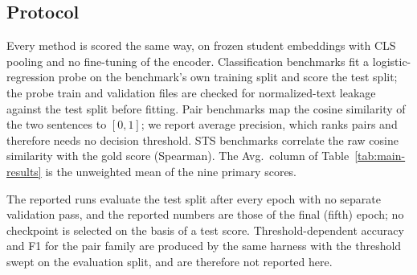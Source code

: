 \subsection{Protocol}
\label{app:protocol}

Every method is scored the same way, on frozen student embeddings with CLS
pooling and no fine-tuning of the encoder. Classification benchmarks fit a
logistic-regression probe on the benchmark's own training split and score the
test split; the probe train and validation files are checked for
normalized-text leakage against the test split before fitting. Pair benchmarks
map the cosine similarity of the two sentences to $[0,1]$; we report average
precision, which ranks pairs and therefore needs no decision threshold. STS
benchmarks correlate the raw cosine similarity with the gold score
(Spearman). The Avg.\ column of Table~\ref{tab:main-results} is the unweighted
mean of the nine primary scores.

The reported runs evaluate the test split after every epoch with no separate
validation pass, and the reported numbers are those of the final (fifth) epoch;
no checkpoint is selected on the basis of a test score. Threshold-dependent
accuracy and F1 for the pair family are produced by the same harness with the
threshold swept on the evaluation split, and are therefore not reported here.
